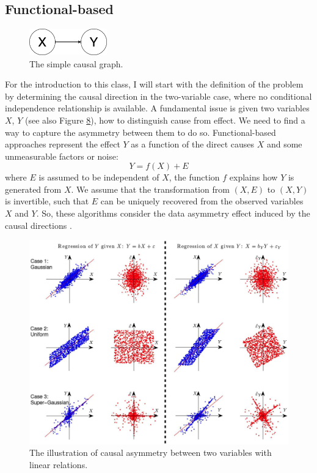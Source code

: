 \subsection{Functional-based}
\begin{figure}[H]
\centering
    \label{fig:x-y}
    \includegraphics[width=0.3\textwidth]{figures/x_y.png}
    \caption{The simple causal graph.}
\end{figure}
For the introduction to this class, I will start with the definition of the problem by determining the causal direction in the two-variable case, where no conditional independence relationship is available. A fundamental issue is given two variables $X$, $Y$ (see also Figure \hyperref[fig:x-y]{8}), how to distinguish cause from effect. We need to find a way to capture the asymmetry between them to do so. Functional-based approaches represent the effect $Y$ as a function of the direct causes $X$ and some unmeasurable factors or noise:
\begin{equation}
Y = f(X) + E
\end{equation}
where $E$ is assumed to be independent of $X$, the function $f$ explains how $Y$ is generated from $X$. We assume that the transformation from $(X, E)$ to $(X, Y)$ is invertible, such that $E$ can be uniquely recovered from the observed variables $X$ and $Y$. So, these algorithms consider the data asymmetry effect induced by the causal directions \cite{glymour2019review}.
\begin{figure}[H]
\centering
    \label{fig:fb-example}
    \includegraphics[width=\textwidth]{figures/fb_example.png}
    \caption{The illustration of causal asymmetry between two variables with linear relations.}
\end{figure}
